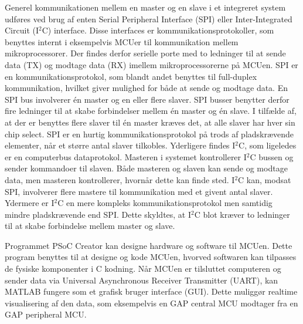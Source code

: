 Generel kommunikationen mellem en master og en slave i et integreret system udføres ved brug af enten Serial Peripheral Interface (SPI) eller Inter-Integrated Circuit (I$^{2}$C) interface. Disse interfaces er kommunikationsprotokoller, som benyttes internt i eksempelvis MCUer til kommunikation mellem mikroprocessorer. Der findes derfor serielle porte med to ledninger til at sende data (TX) og modtage data (RX) imellem mikroprocessorerne på MCUen. \citep{Semiconductor2016} \newline
SPI er en kommunikationsprotokol, som blandt andet benyttes til full-duplex kommunikation, hvilket giver mulighed for både at sende og modtage data. En SPI bus involverer én master og en eller flere slaver. SPI busser benytter derfor fire ledninger til at skabe forbindelser mellem én master og én slave. I tilfælde af, at der er benyttes flere slaver til én master kræves det, at alle slaver har hver sin chip select. SPI er en hurtig kommunikationsprotokol på trods af pladskrævende elementer, når et større antal slaver tilkobles. \citep{Semiconductor2016,Sparkfun2016} \newline
Yderligere findes I$^{2}$C, som ligeledes er en computerbus dataprotokol. Masteren i systemet kontrollerer I$^{2}$C bussen og sender kommandoer til slaven. Både masteren og slaven kan sende og modtage data, men masteren kontrollerer, hvornår dette kan finde sted. I$^{2}$C kan, modsat SPI, involverer flere mastere til kommunikation med et givent antal slaver. Ydermere er I$^{2}$C en mere kompleks kommunikationsprotokol men samtidig mindre pladskrævende end SPI. Dette skyldtes, at I$^{2}$C blot kræver to ledninger til at skabe forbindelse mellem master og slave. \citep{Semiconductor2016,Sparkfun2016} %

Programmet PSoC Creator kan designe hardware og software til MCUen. Dette program benyttes til at designe og kode MCUen, hvorved softwaren kan tilpasses de fysiske komponenter i C kodning. \citep{Semiconductor2016} Når MCUen er tilsluttet computeren og sender data via Universal Asynchronous Receiver Transmitter (UART), kan MATLAB fungere som et grafisk bruger interface (GUI). Dette muliggør realtime visualisering af den data, som eksempelvis en GAP central MCU modtager fra en GAP peripheral MCU.\citep{Semiconductor2016,Sparkfun2016}

